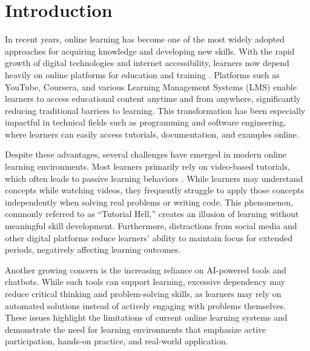 \documentclass[final,3p,times,twocolumn]{elsarticle}
\begin{document}


\section{Introduction}

In recent years, online learning has become one of the most widely adopted approaches for acquiring knowledge and developing new skills. With the rapid growth of digital technologies and internet accessibility, learners now depend heavily on online platforms for education and training \cite{dabbagh2005online,education2022digital}. Platforms such as YouTube, Coursera, and various Learning Management Systems (LMS) enable learners to access educational content anytime and from anywhere, significantly reducing traditional barriers to learning. This transformation has been especially impactful in technical fields such as programming and software engineering, where learners can easily access tutorials, documentation, and examples online.

Despite these advantages, several challenges have emerged in modern online learning environments. Most learners primarily rely on video-based tutorials, which often leads to passive learning behaviors \cite{ehlers2011quality}. While learners may understand concepts while watching videos, they frequently struggle to apply those concepts independently when solving real problems or writing code. This phenomenon, commonly referred to as ``Tutorial Hell,'' creates an illusion of learning without meaningful skill development. Furthermore, distractions from social media and other digital platforms reduce learners’ ability to maintain focus for extended periods, negatively affecting learning outcomes.

Another growing concern is the increasing reliance on AI-powered tools and chatbots. While such tools can support learning, excessive dependency may reduce critical thinking and problem-solving skills, as learners may rely on automated solutions instead of actively engaging with problems themselves. These issues highlight the limitations of current online learning systems and demonstrate the need for learning environments that emphasize active participation, hands-on practice, and real-world application.
\end{document}
